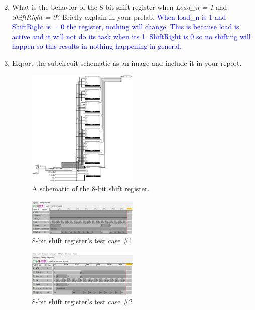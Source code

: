 \documentclass{article}
\begin{document}
\begin{enumerate}
\setcounter{enumi}{1}
\item What is the behavior of the 8-bit shift register when \textit{Load\_n = 1} and \textit{ShiftRight = 0}? Briefly explain in your prelab.  
\textcolor{blue}{ 
When load\_n is 1 and ShiftRight is = 0 the register, nothing will change. This is because load is active and it will not do its task when its 1. ShiftRight is 0 so no shifting will happen so this results in nothing happening in general.}

\item Export the subcircuit schematic as an image and include it in your report.

\begin{figure}[ht!]
    \centering
    \includegraphics[width=0.5\textwidth]{lab4_shifter_bit.png}
    \caption{A schematic of the 8-bit shift register.}
    \label{f:shifter_bit}
\end{figure}


\begin{figure}[ht!]
    \centering
    \includegraphics[width=0.5\textwidth]{lab4_shifter_test_1.png}
    \caption{8-bit shift register's test case \#1}
    \label{f:timing_shifter_bit1}
\end{figure}

\begin{figure}[ht!]
    \centering
    \includegraphics[width=0.5\textwidth]{lab4_shifter_test_2.png}
    \caption{8-bit shift register's test case \#2}
    \label{f:timing_shifter_bit2}
\end{figure}


\end{enumerate}
\end{document}

